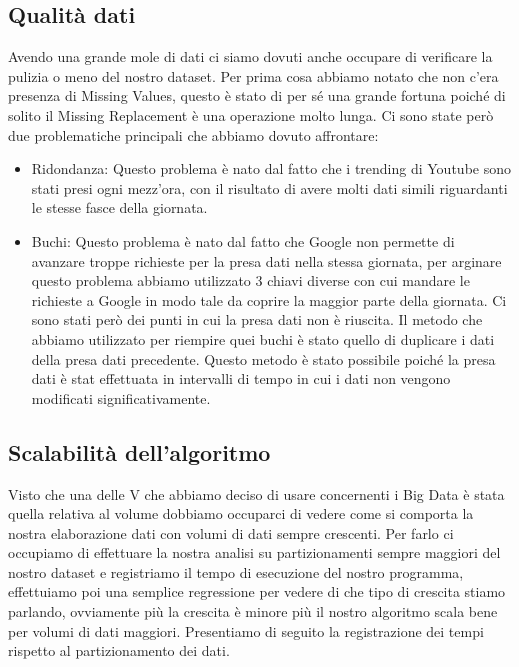 \documentclass[10pt, a4paper,openany]{article}
\begin{document}
\subsection*{Qualità dati}

Avendo una grande mole di dati ci siamo dovuti anche occupare di verificare la pulizia o meno del nostro dataset. Per prima cosa abbiamo notato che non c'era presenza di Missing Values, questo è stato di per sé una grande fortuna poiché di solito il Missing Replacement è una operazione molto lunga.  Ci sono state però due problematiche principali che abbiamo dovuto affrontare:
\begin{itemize}
	\item Ridondanza: Questo problema è nato dal fatto che i trending di Youtube sono stati presi ogni mezz'ora, con il risultato di avere molti dati simili riguardanti le stesse fasce della giornata. 
	\item Buchi: Questo problema è nato dal fatto che Google non permette di avanzare troppe richieste per la presa dati nella stessa giornata, per arginare questo problema abbiamo utilizzato 3 chiavi diverse con cui mandare le richieste a Google in modo tale da coprire la maggior parte della giornata. Ci sono stati però dei punti in cui la presa dati non è riuscita. Il metodo che abbiamo utilizzato per riempire quei buchi è stato quello di duplicare i dati della presa dati precedente. Questo metodo è stato possibile poiché la presa dati è stat effettuata in intervalli di tempo in cui i dati non vengono modificati significativamente.
	
\end{itemize}

\subsection*{Scalabilità dell'algoritmo}

Visto che una delle V che abbiamo deciso di usare concernenti i Big Data è stata quella relativa al volume dobbiamo occuparci di vedere come si comporta la nostra elaborazione dati con volumi di dati sempre crescenti. Per farlo ci occupiamo di effettuare la nostra analisi su partizionamenti sempre maggiori del nostro dataset e registriamo il tempo di esecuzione del nostro programma, effettuiamo poi una semplice regressione per vedere di che tipo di crescita stiamo parlando, ovviamente più la crescita è minore più il nostro algoritmo scala bene per volumi di dati maggiori. Presentiamo di seguito la registrazione dei tempi rispetto al partizionamento dei dati. 
\end{document}

